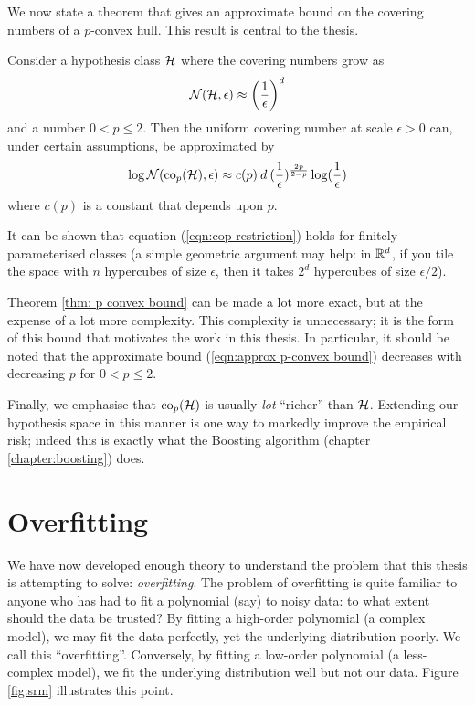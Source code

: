 We now state a theorem that gives an approximate bound on the covering
numbers of a $p$-convex hull.  This result is central to the thesis.

\begin{theorem}
\label{thm: p convex bound}
Consider a hypothesis class $\mathcal{H}$ where the covering numbers grow as
%
\begin{equation}
\mathcal{N}({\mathcal{H}}, {\epsilon}) \approx \left( \frac{1}{\epsilon} \right) ^d
\label{eqn:cop restriction}
\end{equation}
%
and a number $0 < p \leq 2$.  Then the uniform covering number at scale
$\epsilon > 0$ can, under certain assumptions, be approximated by
%
\begin{equation}
\label{eqn:approx p-convex bound}
\log \mathcal{N}({\mathrm{co}_p(\mathcal{H})}, {\epsilon}) \approx c(p) \: d \: (\frac{1}
{\epsilon})^{\frac{2p}{2-p}} \log (\frac{1}{\epsilon})
\end{equation}
%
where $c(p)$ is a constant that depends upon $p$.
\end{theorem}

It can be shown that equation (\ref{eqn:cop restriction}) holds for
finitely parameterised classes (a simple geometric argument may help:
in $\mathbb{R}^d$, if you tile the space with $n$ hypercubes of size
$\epsilon$, then it takes $2^d$ hypercubes of size $\epsilon/2$).
 
Theorem \ref{thm: p convex bound} can be made a lot more exact, but at
the expense of a lot more complexity.  This complexity is unnecessary;
it is the form of this bound that motivates the work in this thesis.
In particular, it should be noted that the approximate bound
(\ref{eqn:approx p-convex bound}) decreases with decreasing $p$ for $0
< p \leq 2$.

Finally, we emphasise that $\mathrm{co}_{p}(\mathcal{H})$ is usually \emph{lot}
``richer'' than $\mathcal{H}$.  Extending our hypothesis space in this
manner is one way to markedly improve the empirical risk; indeed this
is exactly what the Boosting algorithm (chapter
\ref{chapter:boosting}) does. 


\section{Overfitting}
\label{sec:overfitting}

We have now developed enough theory to understand the problem that
this thesis is attempting to solve: \emph{overfitting}.  The problem
of overfitting is quite familiar to anyone who has had to fit a
polynomial (say) to noisy data: to what extent should the data be
trusted?  By fitting a high-order polynomial (a complex model), we may
fit the data perfectly, yet the underlying distribution poorly.  We
call this ``overfitting''.  Conversely, by fitting a low-order
polynomial (a less-complex model), we fit the underlying distribution
well but not our data.  Figure \ref{fig:srm} illustrates this
point.

